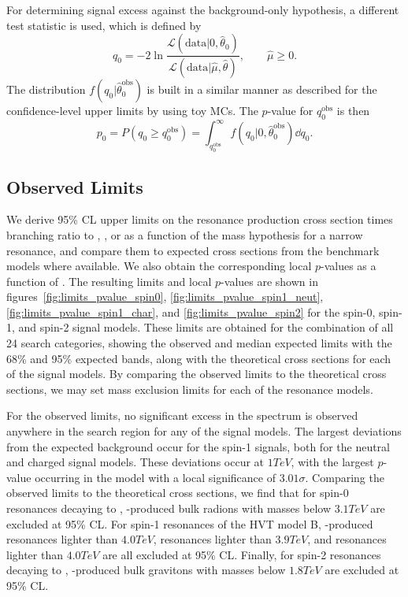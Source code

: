 For determining signal excess against the background-only hypothesis, a different test statistic is used, which is defined by
\begin{equation}
  q_0=-2\ln\frac{\mathcal{L}(\mathrm{data}|0,\hat{\theta}_0)}{\mathcal{L}(\mathrm{data}|\hat{\mu},\hat{\theta})},\qquad \hat{\mu}\geq0.
\end{equation}
The distribution $f(q_0|\hat{\theta}_0^\mathrm{obs})$ is built in a similar manner as described for the confidence-level upper limits by using toy MCs.
The $p$-value for $q_0^\mathrm{obs}$ is then
\begin{equation}
  p_0=P(q_0\geq q_0^\mathrm{obs})=\int_{q_0^\mathrm{obs}}^\infty f(q_0|0,\hat{\theta}_0^\mathrm{obs})\dd{q_0}.
\end{equation}

\subsection{Observed Limits}

We derive 95\% CL upper limits on the resonance production cross section times branching ratio to \WW, \WZ, or \WH as a function of the mass hypothesis \MX for a narrow resonance, and compare them to expected cross sections from the benchmark models where available.
We also obtain the corresponding local $p$-values as a function of \MX.
The resulting limits and local $p$-values are shown in figures~\ref{fig:limits_pvalue_spin0}, \ref{fig:limits_pvalue_spin1_neut}, \ref{fig:limits_pvalue_spin1_char}, and \ref{fig:limits_pvalue_spin2} for the spin-0, spin-1, and spin-2 signal models.
These limits are obtained for the combination of all 24 search categories, showing the observed and median expected limits with the 68\% and 95\% expected bands, along with the theoretical cross sections for each of the signal models.
By comparing the observed limits to the theoretical cross sections, we may set mass exclusion limits for each of the resonance models.

For the observed limits, no significant excess in the \MX spectrum is observed anywhere in the search region for any of the signal models.
The largest deviations from the expected background occur for the \VBF spin-1 signals, both for the neutral and charged signal models.
These deviations occur at $1\unit{TeV}$, with the largest $p$-value occurring in the \VBF\WprtoWZ model with a local significance of $3.01\sigma$.
Comparing the observed limits to the theoretical cross sections, we find that for spin-0 resonances decaying to \WW, \ggF-produced bulk radions with masses below $3.1\unit{TeV}$ are excluded at 95\% CL.
For spin-1 resonances of the HVT model B, \DY-produced \ZprtoWW resonances lighter than $4.0\unit{TeV}$, \WprtoWZ resonances lighter than $3.9\unit{TeV}$, and \WprtoWH resonances lighter than $4.0\unit{TeV}$ are all excluded at 95\% CL.
Finally, for spin-2 resonances decaying to \WW, \ggF-produced bulk gravitons with masses below $1.8\unit{TeV}$ are excluded at 95\% CL.

